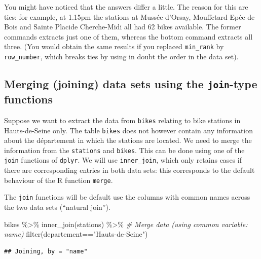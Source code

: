 \documentclass[
]{book}
\newenvironment{Shaded}{\begin{snugshade}}{\end{snugshade}}
\newcommand{\CommentTok}[1]{\textcolor[rgb]{0.56,0.35,0.01}{\textit{#1}}}
\newcommand{\FunctionTok}[1]{\textcolor[rgb]{0.00,0.00,0.00}{#1}}
\newcommand{\NormalTok}[1]{#1}
\newcommand{\SpecialCharTok}[1]{\textcolor[rgb]{0.00,0.00,0.00}{#1}}
\newcommand{\StringTok}[1]{\textcolor[rgb]{0.31,0.60,0.02}{#1}}
\begin{document}
You might have noticed that the answers differ a little. The reason for this are ties: for example, at 1.15pm the stations at Mussée d'Orsay, Mouffetard Epée de Bois and Sainte Placide Cherche-Midi all had 62 bikes available. The former commands extracts just one of them, whereas the bottom command extracts all three.
(You would obtain the same results if you replaced \texttt{min\_rank} by \texttt{row\_number}, which breaks ties by using in doubt the order in the data set).

\hypertarget{merging-joining-data-sets-using-the-join-type-functions}{%
\subsection{\texorpdfstring{Merging (joining) data sets using the \texttt{join}-type functions}{Merging (joining) data sets using the join-type functions}}\label{merging-joining-data-sets-using-the-join-type-functions}}

Suppose we want to extract the data from \texttt{bikes} relating to bike stations in Hauts-de-Seine only. The table \texttt{bikes} does not however contain any information about the département in which the stations are located. We need to merge the information from the \texttt{stations} and \texttt{bikes}. This can be done using one of the \texttt{join} functions of \texttt{dplyr}. We will use \texttt{inner\_join}, which only retains cases if there are corresponding entries in both data sets: this corresponds to the default behaviour of the R function \texttt{merge}.

The \texttt{join} functions will be default use the columns with common names across the two data sets (``natural join'').

\begin{Shaded}
\begin{Highlighting}[]
\NormalTok{bikes }\SpecialCharTok{\%\textgreater{}\%} \FunctionTok{inner\_join}\NormalTok{(stations) }\SpecialCharTok{\%\textgreater{}\%}              \CommentTok{\# Merge data (using common variable: name)}
  \FunctionTok{filter}\NormalTok{(departement}\SpecialCharTok{==}\StringTok{"Hauts{-}de{-}Seine"}\NormalTok{)}
\end{Highlighting}
\end{Shaded}

\begin{verbatim}
## Joining, by = "name"
\end{verbatim}
\end{document}
